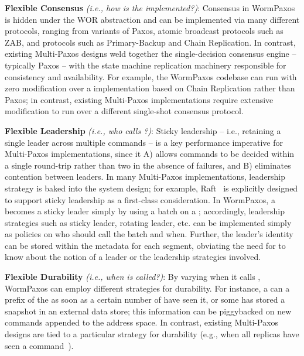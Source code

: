 \textbf{Flexible Consensus} \textit{(i.e., how is the \WOR{} implemented?)}: Consensus in WormPaxos is hidden under the WOR abstraction and can be implemented via many different protocols, ranging from variants of Paxos, atomic broadcast protocols such as ZAB, and protocols such as Primary-Backup and Chain Replication. In contrast, existing Multi-Paxos designs weld together the single-decision consensus engine -- typically Paxos -- with the state machine replication machinery responsible for consistency and availability. 
For example, the WormPaxos codebase can run with zero modification over a \WOR{} implementation based on Chain Replication rather than Paxos; in contrast, existing Multi-Paxos implementations require extensive modification to run over a different single-shot consensus protocol.

\textbf{Flexible Leadership} \textit{(i.e., who calls \api{\prepare{}}?)}: Sticky leadership -- i.e., retaining a single leader across multiple commands -- is a key performance imperative for Multi-Paxos implementations, since it A) allows commands to be decided within a single round-trip rather than two in the absence of failures, and B) eliminates contention between leaders. In many Multi-Paxos implementations, leadership strategy is baked into the system design; for example, Raft~\cite{raft} is explicitly designed to support sticky leadership as a first-class consideration. In WormPaxos, a \WPserver{} becomes a sticky leader simply by using a batch \api{\prepare{}} on a \WOS{}; accordingly, leadership strategies such as sticky leader, rotating leader, etc. can be implemented simply as policies on who should call the batch \api{\prepare{}} and when. Further, the leader's identity can be stored within the metadata for each segment, obviating the need for \sysname{} to know about the notion of a leader or the leadership strategies involved.

\textbf{Flexible Durability} \textit{(i.e., when is  called?)}: By varying when it calls , WormPaxos can employ different strategies for durability. For instance, a \WPserver{} can  a prefix of the \sysname{} as soon as a certain number of \WPservers{} have seen it, or some \WPserver{} has stored a snapshot in an external data store; this information can be piggybacked on new commands appended to the address space. In contrast, existing Multi-Paxos designs are tied to a particular strategy for durability (e.g., when all replicas have seen a command~\cite{rvrpaxos}).

